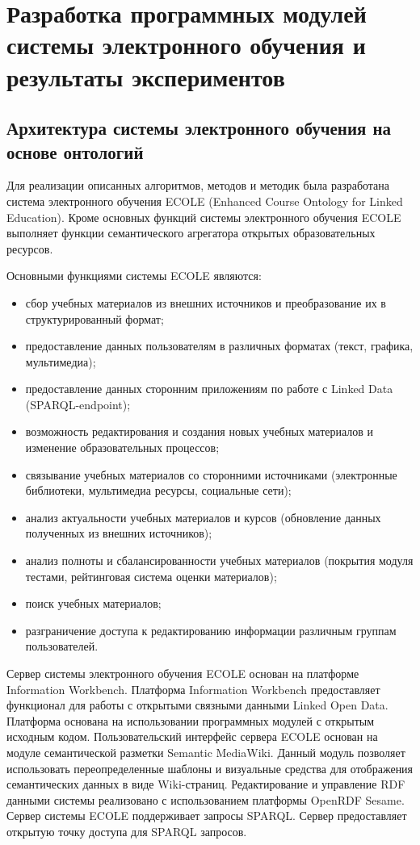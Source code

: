 \chapter{Разработка программных модулей системы электронного обучения и результаты экспериментов} \label{chapt4}

\section{Архитектура системы электронного обучения на основе онтологий} \label{sect4_1}

Для реализации описанных алгоритмов, методов и методик была разработана система электронного обучения ECOLE (Enhanced Course Ontology for Linked Education). Кроме основных функций системы электронного обучения ECOLE выполняет функции семантического агрегатора открытых образовательных ресурсов.

Основными функциями системы ECOLE являются:

\begin{itemize}
\item сбор учебных материалов из внешних источников и преобразование их в структурированный формат;
\item предоставление данных пользователям в различных форматах (текст, графика, мультимедиа);
\item предоставление данных сторонним приложениям по работе с Linked Data (SPARQL-endpoint);
\item возможность редактирования и создания новых учебных материалов и изменение образовательных процессов;
\item связывание учебных материалов со сторонними источниками (электронные библиотеки, мультимедиа ресурсы, социальные сети);
\item анализ актуальности учебных материалов и курсов (обновление данных полученных из внешних источников);
\item анализ полноты и сбалансированности учебных материалов (покрытия модуля тестами, рейтинговая система оценки материалов);
\item поиск учебных материалов;
\item разграничение доступа к редактированию информации различным группам пользователей.
\end{itemize}

Сервер системы электронного обучения ECOLE основан на платформе Information Workbench. Платформа Information Workbench предоставляет функционал для работы с открытыми связными данными Linked Open Data. Платформа основана на использовании программных модулей с открытым исходным кодом. Пользовательский интерфейс сервера ECOLE основан на модуле семантической разметки Semantic MediaWiki. Данный модуль позволяет использовать переопределенные шаблоны и визуальные средства для отображения семантических данных в виде Wiki-страниц. Редактирование и управление RDF данными системы реализовано с использованием платформы OpenRDF Sesame. Сервер системы ECOLE поддерживает запросы SPARQL. Сервер предоставляет открытую точку доступа для SPARQL запросов.

